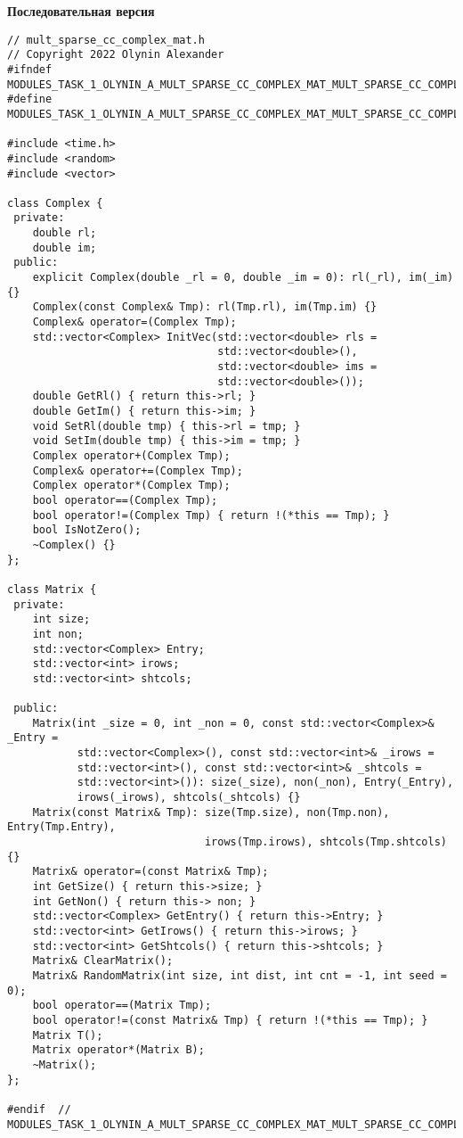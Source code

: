 \documentclass[12pt]{report}
\begin{document}
\textbf{Последовательная версия}
\begin{lstlisting}
// mult_sparse_cc_complex_mat.h
// Copyright 2022 Olynin Alexander
#ifndef MODULES_TASK_1_OLYNIN_A_MULT_SPARSE_CC_COMPLEX_MAT_MULT_SPARSE_CC_COMPLEX_MAT_H_
#define MODULES_TASK_1_OLYNIN_A_MULT_SPARSE_CC_COMPLEX_MAT_MULT_SPARSE_CC_COMPLEX_MAT_H_

#include <time.h>
#include <random>
#include <vector>

class Complex {
 private:
    double rl;
    double im;
 public:
    explicit Complex(double _rl = 0, double _im = 0): rl(_rl), im(_im) {}
    Complex(const Complex& Tmp): rl(Tmp.rl), im(Tmp.im) {}
    Complex& operator=(Complex Tmp);
    std::vector<Complex> InitVec(std::vector<double> rls =
                                 std::vector<double>(),
                                 std::vector<double> ims =
                                 std::vector<double>());
    double GetRl() { return this->rl; }
    double GetIm() { return this->im; }
    void SetRl(double tmp) { this->rl = tmp; }
    void SetIm(double tmp) { this->im = tmp; }
    Complex operator+(Complex Tmp);
    Complex& operator+=(Complex Tmp);
    Complex operator*(Complex Tmp);
    bool operator==(Complex Tmp);
    bool operator!=(Complex Tmp) { return !(*this == Tmp); }
    bool IsNotZero();
    ~Complex() {}
};

class Matrix {
 private:
    int size;
    int non;
    std::vector<Complex> Entry;
    std::vector<int> irows;
    std::vector<int> shtcols;

 public:
    Matrix(int _size = 0, int _non = 0, const std::vector<Complex>& _Entry =
           std::vector<Complex>(), const std::vector<int>& _irows =
           std::vector<int>(), const std::vector<int>& _shtcols =
           std::vector<int>()): size(_size), non(_non), Entry(_Entry),
           irows(_irows), shtcols(_shtcols) {}
    Matrix(const Matrix& Tmp): size(Tmp.size), non(Tmp.non), Entry(Tmp.Entry),
                               irows(Tmp.irows), shtcols(Tmp.shtcols) {}
    Matrix& operator=(const Matrix& Tmp);
    int GetSize() { return this->size; }
    int GetNon() { return this-> non; }
    std::vector<Complex> GetEntry() { return this->Entry; }
    std::vector<int> GetIrows() { return this->irows; }
    std::vector<int> GetShtcols() { return this->shtcols; }
    Matrix& ClearMatrix();
    Matrix& RandomMatrix(int size, int dist, int cnt = -1, int seed = 0);
    bool operator==(Matrix Tmp);
    bool operator!=(const Matrix& Tmp) { return !(*this == Tmp); }
    Matrix T();
    Matrix operator*(Matrix B);
    ~Matrix();
};

#endif  // MODULES_TASK_1_OLYNIN_A_MULT_SPARSE_CC_COMPLEX_MAT_MULT_SPARSE_CC_COMPLEX_MAT_H_
\end{lstlisting}
\end{document}
